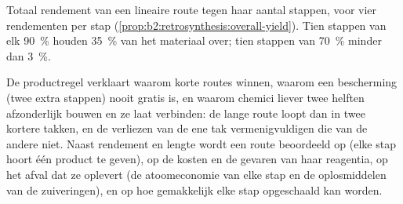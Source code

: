 \begin{omfigure}
\par\vspace{4pt}

{\small Totaal rendement van een lineaire route tegen haar aantal stappen, voor vier rendementen per stap
(\cref{prop:b2:retrosynthesis:overall-yield}). Tien stappen van elk 90~\% houden 35~\% van het materiaal over; tien
stappen van 70~\% minder dan 3~\%.}
\end{omfigure}

De productregel verklaart waarom korte routes winnen, waarom een bescherming (twee extra stappen) nooit gratis is, en waarom
chemici liever twee helften afzonderlijk bouwen en ze laat verbinden: de lange route loopt dan in twee
kortere takken, en de verliezen van de ene tak vermenigvuldigen die van de andere niet. Naast rendement en
lengte wordt een route beoordeeld op  (elke stap hoort één product te geven), op de kosten en de gevaren
van haar reagentia, op het afval dat ze oplevert (de atoomeconomie van elke stap en de oplosmiddelen van de
zuiveringen), en op hoe gemakkelijk elke stap opgeschaald kan worden.

